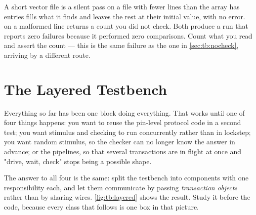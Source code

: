 \begin{gotcha}{A short vector file is a silent pass}
 on a file with fewer lines than the array has entries
fills what it finds and leaves the rest at their initial value, with no
error.  on a malformed line returns a count you did not check.
Both produce a run that reports zero failures because it performed zero
comparisons. Count what you read and assert the count --- this is the same
failure as the one in \cref{sec:tb:nocheck}, arriving by a different route.
\end{gotcha}


\section{The Layered Testbench}
\label{sec:tb:layered}

Everything so far has been one  block doing everything. That
works until one of four things happens: you want to reuse the pin-level
protocol code in a second test; you want stimulus and checking to run
concurrently rather than in lockstep; you want random stimulus, so the checker
can no longer know the answer in advance; or the \DUT{} pipelines, so that
several transactions are in flight at once and "drive, wait, check" stops being
a possible shape.

The answer to all four is the same: split the testbench into components with
one responsibility each, and let them communicate by passing \emph{transaction
objects} rather than by sharing wires. \cref{fig:tb:layered} shows the result.
Study it before the code, because every class that follows is one box in that
picture.

